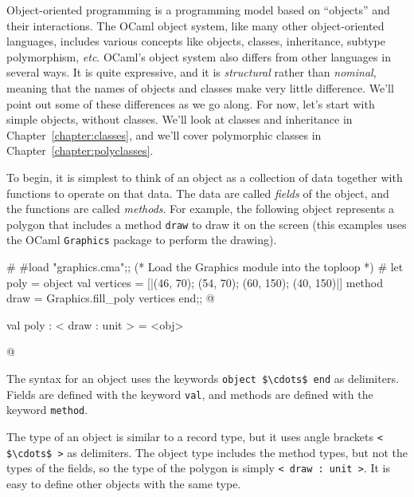 
Object-oriented programming is a programming model based on ``objects'' and their interactions.  The
OCaml object system, like many other object-oriented languages, includes various concepts
like objects, classes, inheritance, subtype polymorphism, \emph{etc}.
OCaml's object system also differs from other languages in several ways.  It is quite expressive,
and it is \emph{structural} rather than \emph{nominal}, meaning that the names of objects and
classes make very little difference.  We'll point out some of these differences as we go along.  For
now, let's start with simple objects, without classes.  We'll look at classes and inheritance in
Chapter~\ref{chapter:classes}, and we'll cover polymorphic classes in
Chapter~\ref{chapter:polyclasses}.

%
To begin, it is simplest to think of an object as a collection of data together with functions to
operate on that data.  The data are called \emph{fields} of the object, and the functions are called
\emph{methods}.  For example, the following object represents a polygon that includes a method
\hbox{\lstinline/draw/} to draw it on the screen (this examples uses the OCaml
\hbox{\lstinline/Graphics/} package to perform the drawing).

\label{keyword:val(objects)}
\label{keyword:object}
\label{keyword:method}
\begin{ocaml}
# #load "graphics.cma";;  (* Load the Graphics module into the toploop *)
# let poly =
  object
     val vertices = [|(46, 70); (54, 70); (60, 150); (40, 150)|]
     method draw = Graphics.fill_poly vertices
  end;;
@
\begin{topoutput}
val poly : < draw : unit > = <obj>
\end{topoutput}
@
\end{ocaml}
%
The syntax for an object uses the keywords \hbox{\lstinline/object $\cdots$ end/} as delimiters.  
Fields are defined with the keyword \hbox{\lstinline/val/}, and methods are defined with the
keyword \hbox{\lstinline/method/}.

\label{object-types}
The type of an object is similar to a record type, but it uses angle brackets
%
\hbox{\lstinline/< $\cdots$ >/} as delimiters.
The object type includes the method types, but not the types of the fields, so the type of
the polygon is simply \hbox{\lstinline/< draw : unit >/}.  It is easy to define other objects with the same
type.

